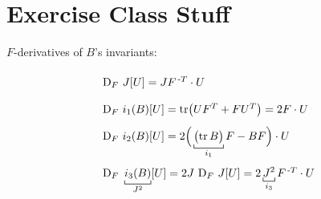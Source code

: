 
\vspace{-1em}


\section{\texorpdfstring{\color{red}Exercise Class Stuff}{}}


$F$-derivatives of $B$'s invariants:
\begin{equation*}
{\renewcommand*{\arraystretch}{2}
\begin{array}{l}
\text{D}_F\ J[U]=JF^{\,\text{-}T}\cdot U \\
\text{D}_F\ i_1(B)[U]=\text{tr}\big(UF^T+FU^T\big)=2F\cdot U \\
\text{D}_F\ i_2(B)[U]=2\Big(\underbracket[0.5pt]{\big(\text{tr}\,B\big)}_{i_1}F-BF  \Big)\cdot U \\
\text{D}_F\ \underbracket[0.5pt]{i_3(B)}_{J^2}[U]=2J\ \text{D}_F\ J[U]=2\underbracket[0.5pt]{J^2}_{i_3}F^{\,\text{-}T}\cdot U 
\end{array}}
\end{equation*}

